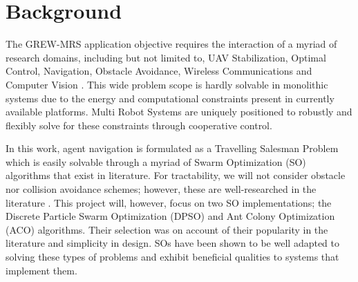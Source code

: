 \documentclass{report}
\begin{document}
\chapter{Background} \label{background}
The GREW-MRS application objective requires the interaction of a myriad of research domains, including but not limited to, UAV Stabilization, Optimal Control, Navigation, Obstacle Avoidance, Wireless Communications and Computer Vision \cite{Guerrero2013}. This wide problem scope is hardly solvable in monolithic systems due to the energy and computational constraints present in currently available platforms. Multi Robot Systems are uniquely positioned to robustly and flexibly solve for these constraints through cooperative control.

In this work, agent navigation is formulated as a Travelling Salesman Problem which is easily solvable through a myriad of Swarm Optimization (SO) algorithms that exist in literature. For tractability, we will not consider obstacle nor collision avoidance schemes; however, these are well-researched in the literature \cite{Galceran2013}. This project will, however, focus on two SO implementations; the Discrete Particle Swarm Optimization (DPSO) and Ant Colony Optimization (ACO) algorithms. Their selection was on account of their popularity in the literature \cite{Tan2013} and simplicity in design. SOs have been shown to be well adapted to solving these types of problems and exhibit beneficial qualities to systems that implement them.
\end{document}
